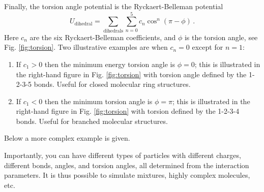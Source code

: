 \documentclass[11pt]{article}
\begin{document}
Finally, the torsion angle potential is the Ryckaert-Belleman potential 
\begin{equation}
  U_\mathrm{dihedral}=\sum_{\mathrm{dihedrals}} \sum_{n=0}^5 c_n
  \cos^n(\pi-\phi)
   \, . 
\end{equation}
Here $c_n$ are the six Ryckaert-Belleman coefficients, and $\phi$ is the
torsion angle, see Fig. \ref{fig:torsion}. Two illustrative 
examples are when $c_n = 0$ except for $n=1$:
\begin{enumerate}
\item If $c_1 > 0$ then the minimum energy torsion angle is $\phi = 0$; this is
  illustrated in the right-hand figure in Fig. \ref{fig:torsion} with torsion
  angle defined by the 1-2-3-5 bonds. Useful for closed molecular ring
  structures.
\item If $c_1 < 0$ then the minimum torsion angle is $\phi = \pi$; this is
  illustrated in the right-hand figure in Fig. \ref{fig:torsion} with
  torsion defined by the 1-2-3-4 bonds. Useful for branched molecular
  structures. 
\end{enumerate}
Below a more complex example is given.

Importantly, you can have different types of particles with different charges,
different bonds, angles, and torsion angles, all determined from the interaction
parameters. It is thus possible to simulate mixtures, highly complex molecules,
etc.
\end{document}

